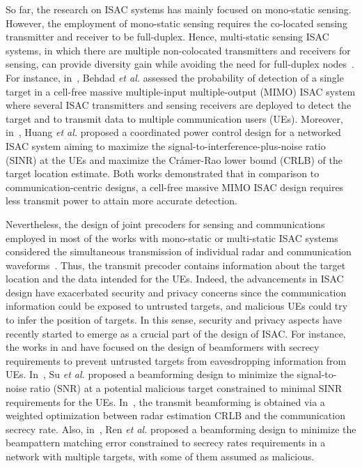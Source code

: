 \documentclass[conference,twocolumn,a4paper]{IEEEtran}
\theoremstyle{remark} \newtheorem{remark}{Remark}
\begin{document}
So far, the research on ISAC systems has mainly focused on mono-static sensing. However, the employment of mono-static sensing requires the co-located sensing transmitter and receiver to be full-duplex. Hence, multi-static sensing ISAC systems, in which there are multiple non-colocated transmitters and receivers for sensing, can provide diversity gain while avoiding the need for full-duplex nodes~\cite{Art:Emil}. For instance, in~\cite{Art:Emil}, Behdad \textit{et al.} assessed the probability of detection of a single target in a cell-free massive multiple-input multiple-output (MIMO) ISAC system where several ISAC transmitters and sensing receivers are deployed to detect the target and to transmit data to multiple communication users (UEs). Moreover, in~\cite{9842350}, Huang \textit{et al.} proposed a coordinated power control design for a networked ISAC system aiming to maximize the signal-to-interference-plus-noise ratio (SINR) at the UEs and maximize the Cr\'{a}mer-Rao lower bound (CRLB) of the target location estimate. Both works demonstrated that in comparison to communication-centric designs, a cell-free massive MIMO ISAC design requires less transmit power to attain more accurate detection.

Nevertheless, the design of joint precoders for sensing and communications employed in most of the works with mono-static or multi-static ISAC systems considered the simultaneous transmission of individual radar and communication waveforms~\cite{9124713,demirhan2023cell}. Thus, the transmit precoder contains information about the target location and the data intended for the UEs. Indeed, the advancements in ISAC design have exacerbated security and privacy concerns since the communication information could be exposed to untrusted targets, and malicious UEs could try to infer the position of targets. In this sense, security and privacy aspects have recently started to emerge as a crucial part of the design of ISAC. For instance, the works in \cite{art:su2021, 10104579} and \cite{art:ren} have focused on the design of beamformers with secrecy requirements to prevent untrusted targets from eavesdropping information from UEs. In~\cite{art:su2021}, Su \textit{et al.} proposed a beamforming design to minimize the signal-to-noise ratio (SNR) at a potential malicious target constrained to minimal SINR requirements for the UEs. In~\cite{10104579}, the transmit beamforming is obtained via a weighted optimization between radar estimation CRLB and the communication secrecy rate. Also, in~\cite{art:ren}, Ren \textit{et al.} proposed a beamforming design to minimize the beampattern matching error constrained to secrecy rates requirements in a network with multiple targets, with some of them assumed as malicious.
\end{document}
